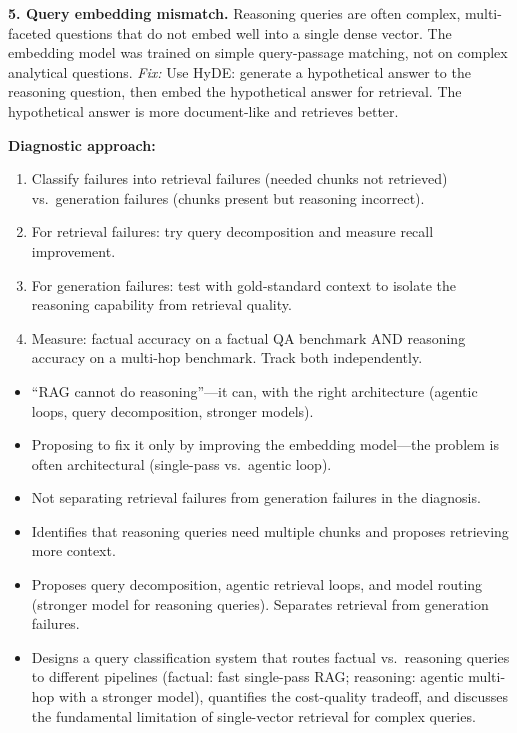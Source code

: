\begin{interviewq}
\textbf{5. Query embedding mismatch.} Reasoning queries are often complex, multi-faceted questions that do not embed well into a single dense vector. The embedding model was trained on simple query-passage matching, not on complex analytical questions.
\textit{Fix:} Use HyDE: generate a hypothetical answer to the reasoning question, then embed the hypothetical answer for retrieval. The hypothetical answer is more document-like and retrieves better.

\textbf{Diagnostic approach:}
\begin{enumerate}
    \item Classify failures into retrieval failures (needed chunks not retrieved) vs.\ generation failures (chunks present but reasoning incorrect).
    \item For retrieval failures: try query decomposition and measure recall improvement.
    \item For generation failures: test with gold-standard context to isolate the reasoning capability from retrieval quality.
    \item Measure: factual accuracy on a factual QA benchmark AND reasoning accuracy on a multi-hop benchmark. Track both independently.
\end{enumerate}

\redflags
\begin{itemize}
    \item ``RAG cannot do reasoning''---it can, with the right architecture (agentic loops, query decomposition, stronger models).
    \item Proposing to fix it only by improving the embedding model---the problem is often architectural (single-pass vs.\ agentic loop).
    \item Not separating retrieval failures from generation failures in the diagnosis.
\end{itemize}


\goodgreat
\begin{itemize}
    \item {} Identifies that reasoning queries need multiple chunks and proposes retrieving more context.
    \item {} Proposes query decomposition, agentic retrieval loops, and model routing (stronger model for reasoning queries). Separates retrieval from generation failures.
    \item {} Designs a query classification system that routes factual vs.\ reasoning queries to different pipelines (factual: fast single-pass RAG; reasoning: agentic multi-hop with a stronger model), quantifies the cost-quality tradeoff, and discusses the fundamental limitation of single-vector retrieval for complex queries.
\end{itemize}


\end{interviewq}
